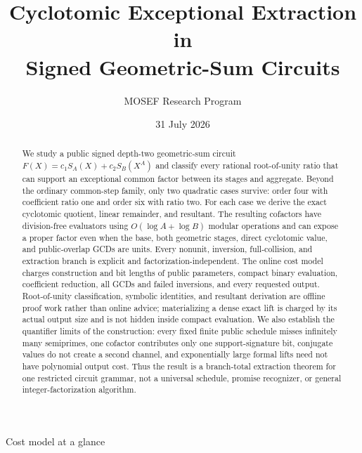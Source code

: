 \documentclass[11pt]{article}
\title{Cyclotomic Exceptional Extraction in\\
Signed Geometric-Sum Circuits}
\author{MOSEF Research Program}
\date{31 July 2026}
\begin{document}
\maketitle

\begin{abstract}
We study a public signed depth-two geometric-sum circuit
\(F(X)=c_1S_A(X)+c_2S_B(X^A)\) and classify every rational
root-of-unity ratio that can support an exceptional common factor between its
stages and aggregate.  Beyond the ordinary common-step family, only two
quadratic cases survive: order four with coefficient ratio one and order six
with ratio two.  For each case we derive the exact cyclotomic quotient,
linear remainder, and resultant.  The resulting cofactors have
division-free evaluators using \(O(\log A+\log B)\) modular operations and can
expose a proper factor even when the base, both geometric stages, direct
cyclotomic value, and public-overlap GCDs are units.  Every nonunit,
inversion, full-collision, and extraction branch is explicit and
factorization-independent.  The online cost model charges construction and
bit lengths of public parameters, compact binary evaluation, coefficient
reduction, all GCDs and failed inversions, and every requested output.
Root-of-unity classification, symbolic identities, and resultant derivation
are offline proof work rather than online advice; materializing a dense exact
lift is charged by its actual output size and is not hidden inside compact
evaluation.  We also establish the quantifier limits of the construction:
every fixed finite public schedule misses infinitely many semiprimes, one
cofactor contributes only one support-signature bit, conjugate values do not
create a second channel, and exponentially large formal lifts need not have
polynomial output cost.  Thus the result is a branch-total extraction theorem
for one restricted circuit grammar, not a universal schedule, promise
recognizer, or general integer-factorization algorithm.
\end{abstract}

\begin{costmodel}{Cost model at a glance}
\end{costmodel}
\end{document}
